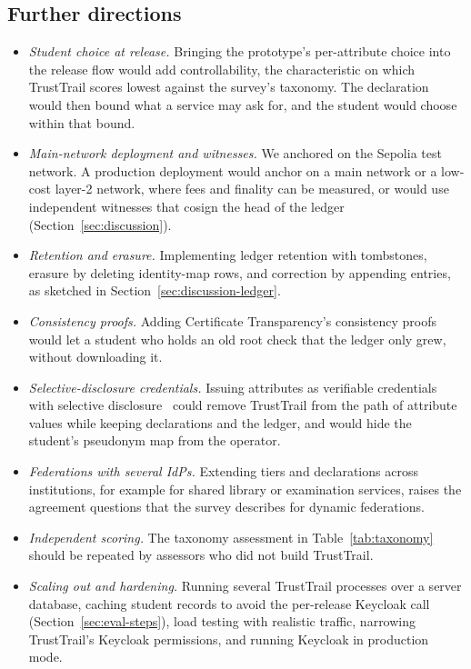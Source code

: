 \subsection{Further directions}
\begin{itemize}
\item \emph{Student choice at release.} Bringing the prototype's per-attribute choice into the release flow would add controllability, the characteristic on which TrustTrail scores lowest against the survey's taxonomy. The declaration would then bound what a service may ask for, and the student would choose within that bound.
\item \emph{Main-network deployment and witnesses.} We anchored on the Sepolia test network. A production deployment would anchor on a main network or a low-cost layer-2 network, where fees and finality can be measured, or would use independent witnesses that cosign the head of the ledger (Section~\ref{sec:discussion}).
\item \emph{Retention and erasure.} Implementing ledger retention with tombstones, erasure by deleting identity-map rows, and correction by appending entries, as sketched in Section~\ref{sec:discussion-ledger}.
\item \emph{Consistency proofs.} Adding Certificate Transparency's consistency proofs~\cite{rfc9162} would let a student who holds an old root check that the ledger only grew, without downloading it.
\item \emph{Selective-disclosure credentials.} Issuing attributes as verifiable credentials with selective disclosure~\cite{w3cvc2} could remove TrustTrail from the path of attribute values while keeping declarations and the ledger, and would hide the student's pseudonym map from the operator.
\item \emph{Federations with several IdPs.} Extending tiers and declarations across institutions, for example for shared library or examination services, raises the agreement questions that the survey describes for dynamic federations.
\item \emph{Independent scoring.} The taxonomy assessment in Table~\ref{tab:taxonomy} should be repeated by assessors who did not build TrustTrail.
\item \emph{Scaling out and hardening.} Running several TrustTrail processes over a server database, caching student records to avoid the per-release Keycloak call (Section~\ref{sec:eval-steps}), load testing with realistic traffic, narrowing TrustTrail's Keycloak permissions, and running Keycloak in production mode.
\end{itemize}
